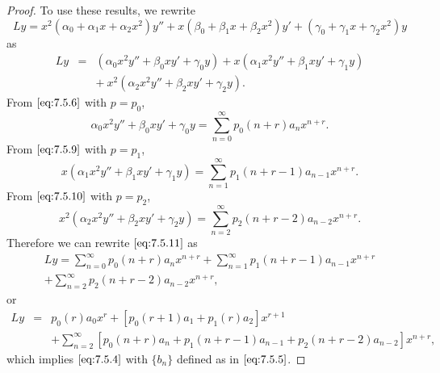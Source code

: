 \documentclass{ximera}
\begin{document}
\begin{proof}
To use these results, we rewrite
$$
Ly=
x^2(\alpha_0+\alpha_1x+\alpha_2x^2)y''+x(\beta_0+\beta_1x+\beta_2x^2)y'
+(\gamma_0+\gamma_1x+\gamma_2x^2)y
$$
 as
\begin{equation} \label{eq:7.5.11}
\begin{array}{ccl}
Ly&=&\left(\alpha_0x^2y''+\beta_0xy'
+\gamma_0y\right) +
x\left(\alpha_1x^2y''+\beta_1xy'+\gamma_1y\right)
\\&&+\
x^2\left(\alpha_2x^2y''+\beta_2xy'+\gamma_2y\right).
\end{array}
\end{equation}
From $\eqref{eq:7.5.6}$ with $p=p_0$,
$$
\alpha_0x^2y''+\beta_0xy'+\gamma_0y=\sum_{n=0}^\infty
p_0(n+r)a_nx^{n+r}.
$$
From $\eqref{eq:7.5.9}$ with $p=p_1$,
$$
x\left(\alpha_1x^2y''+\beta_1xy'+\gamma_1y\right)=\sum_{n=1}^\infty
p_1(n+r-1)a_{n-1}x^{n+r}.
$$
From $\eqref{eq:7.5.10}$ with $p=p_2$,
$$
x^2\left(\alpha_2x^2y''+\beta_2xy'+\gamma_2y\right)=\sum_{n=2}^\infty
p_2(n+r-2)a_{n-2}x^{n+r}.
$$
Therefore we can rewrite $\eqref{eq:7.5.11}$ as
\begin{eqnarray*}
Ly=\sum_{n=0}^\infty p_0(n+r)a_nx^{n+r}+
\sum_{n=1}^\infty p_1(n+r-1)a_{n-1}x^{n+r}\\+
\sum_{n=2}^\infty p_2(n+r-2)a_{n-2}x^{n+r},
\end{eqnarray*}
or
\begin{eqnarray*}
Ly&=& p_0(r)a_0x^r+\left[p_0(r+1)a_1+p_1(r)a_2\right]x^{r+1}\\
&& +\sum_{n=2}^\infty\left[p_0(n+r)a_n+p_1(n+r-1)a_{n-1}
+p_2(n+r-2)a_{n-2}\right]x^{n+r},
\end{eqnarray*}
which implies $\eqref{eq:7.5.4}$ with $\{b_n\}$ defined as in
$\eqref{eq:7.5.5}$.
\end{proof}
\end{document}
